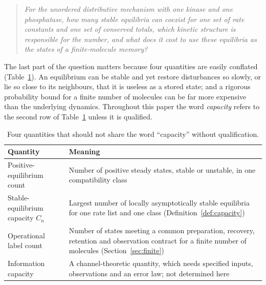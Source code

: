 \documentclass[11pt]{article}
\theoremstyle{plain}
\theoremstyle{definition}
\theoremstyle{remark}
\numberwithin{equation}{section}
\begin{document}
\begin{quote}
\emph{For the unordered distributive mechanism with one kinase and one phosphatase, how many
stable equilibria can coexist for one set of rate constants and one set of conserved totals,
which kinetic structure is responsible for the number, and what does it cost to use these
equilibria as the states of a finite-molecule memory?}
\end{quote}

The last part of the question matters because four quantities are easily conflated
(Table~\ref{tab:notions}). An equilibrium can be stable and yet restore disturbances so slowly,
or lie so close to its neighbours, that it is useless as a stored state; and a rigorous
probability bound for a finite number of molecules can be far more expensive than the
underlying dynamics. Throughout this paper the word \emph{capacity} refers to the second row of
Table~\ref{tab:notions} unless it is qualified.

\begin{table}[tbp]
\centering\small
\caption{Four quantities that should not share the word ``capacity'' without qualification.}
\label{tab:notions}
\begin{tabularx}{\textwidth}{@{}lX@{}}
\toprule
Quantity & Meaning\\
\midrule
Positive-equilibrium count & Number of positive steady states, stable or unstable, in one
compatibility class\\
Stable-equilibrium capacity \(C_n\) & Largest number of locally asymptotically stable
equilibria for one rate list and one class (Definition~\ref{def:capacity})\\
Operational label count & Number of states meeting a common preparation, recovery,
retention and observation contract for a finite number of molecules
(Section~\ref{sec:finite})\\
Information capacity & A channel-theoretic quantity, which needs specified inputs,
observations and an error law; not determined here\\
\bottomrule
\end{tabularx}
\end{table}
\end{document}
